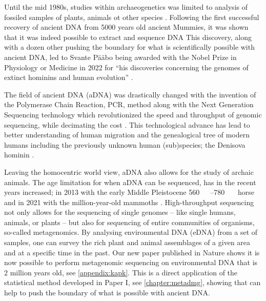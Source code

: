 

Until the mid 1980s, studies within archaeogenetics was limited to analysis of fossiled samples of plants, animals ot other species \autocite{parducciAncientDNAUnlocking2004}. Following the first successful recovery of ancient DNA from 5000 years old ancient Mummies, it was shown that it was indeed possible to extract and sequence DNA \autocite{paaboMolecularCloningAncient1985,paaboPreservationDNAAncient1985}
This discovery, along with a dozen other pushing the boundary for what is scientifically possible with ancient DNA, led to Svante Pääbo being awarded with the Nobel Prize in Physiology or Medicine in 2022 for ``his discoveries concerning the genomes of extinct hominins and human evolution'' \autocite{thenobelassemblyatkarolinskainstitutetNobelPrizePhysiology2022}.


The field of ancient DNA (aDNA) was drastically changed with the invention of the Polymerase Chain Reaction, PCR, method \autocite{mullisSpecificEnzymaticAmplification1986} along with the Next Generation Sequencing technology which revolutionized the speed and throughput of genomic sequencing, while decimating the cost \autocite{slatkoOverviewNextGeneration2018}. This technological advance has lead to better understanding of human migration and the genealogical tree of modern humans including the previously unknown human (sub)species; the Denisova hominin \autocite{krauseCompleteMitochondrialDNA2010}.

Leaving the homocentric world view, aDNA also allows for the study of archaic animals. The age limitation for when aDNA can be sequenced, has in the recent years increased; in 2013 with the early Middle Pleistocene \qtyrange[range-phrase = --,range-units = single]{560}{780}{\kilo\year\BP} horse \autocite{orlandoRecalibratingEquusEvolution2013} and in 2021 with the million-year-old mammoths \autocite{vandervalkMillionyearoldDNASheds2021}. High-throughput sequencing not only allows for the sequencing of single genomes -- like single humans, animals, or plants -- but also for sequencing of entire communities of organisms, so-called metagenomics. By analysing environmental DNA (eDNA) from a set of samples, one can survey the rich plant and animal assemblages of a given area and at a specific time in the past. Our new paper published in Nature shows it is now possible to perform metagenomic sequencing on environmental DNA that is 2 million years old, see \autoref{appendix:kapk}. This is a direct application of the statistical method developed in Paper I, see \autoref{chapter:metadmg}, showing that \metaDMG can help to push the boundary of what is possible with ancient DNA.

